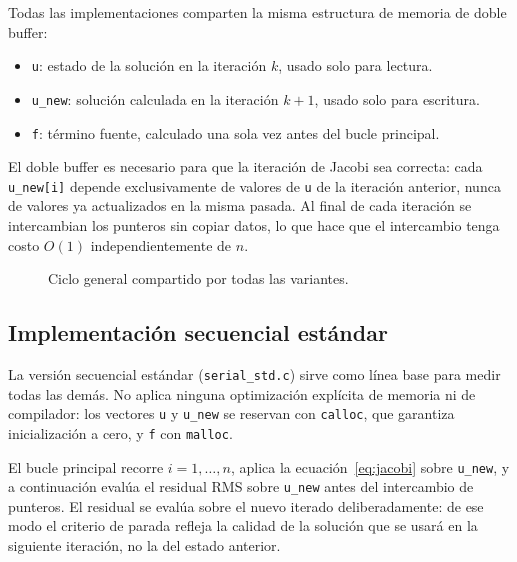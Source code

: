 Todas las implementaciones comparten la misma estructura de memoria de doble buffer:

\begin{itemize}
    \item \texttt{u}: estado de la solución en la iteración $k$, usado solo para lectura.
    \item \texttt{u\_new}: solución calculada en la iteración $k+1$, usado solo para escritura.
    \item \texttt{f}: término fuente, calculado una sola vez antes del bucle principal.
\end{itemize}

El doble buffer es necesario para que la iteración de Jacobi sea correcta: cada \texttt{u\_new[i]} depende exclusivamente de valores de \texttt{u} de la iteración anterior, nunca de valores ya actualizados en la misma pasada. Al final de cada iteración se intercambian los punteros sin copiar datos, lo que hace que el intercambio tenga costo $O(1)$ independientemente de $n$.

\begin{figure}[H]
\centering
{}
\caption{Ciclo general compartido por todas las variantes.}
\label{fig:jacobi_flujo_general}
\end{figure}

\subsection{Implementación secuencial estándar}

La versión secuencial estándar (\texttt{serial\_std.c}) sirve como línea base para medir todas las demás. No aplica ninguna optimización explícita de memoria ni de compilador: los vectores \texttt{u} y \texttt{u\_new} se reservan con \texttt{calloc}, que garantiza inicialización a cero, y \texttt{f} con \texttt{malloc}.

El bucle principal recorre $i = 1, \ldots, n$, aplica la ecuación~\eqref{eq:jacobi} sobre \texttt{u\_new}, y a continuación evalúa el residual RMS sobre \texttt{u\_new} antes del intercambio de punteros. El residual se evalúa sobre el nuevo iterado deliberadamente: de ese modo el criterio de parada refleja la calidad de la solución que se usará en la siguiente iteración, no la del estado anterior.


